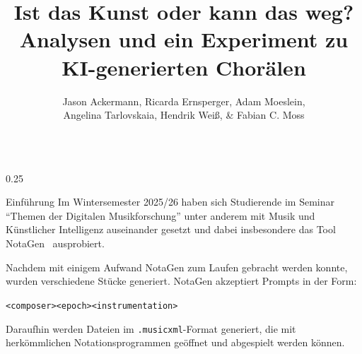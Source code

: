 \documentclass[final]{beamer}
\title{\Huge Ist das Kunst oder kann das weg? \\ \huge Analysen und ein Experiment zu KI-generierten Chorälen}
\author{Jason Ackermann, Ricarda Ernsperger, Adam Moeslein,\\ Angelina Tarlovskaia, Hendrik Weiß, \& Fabian C. Moss}
\institute{Institut für Musikforschung | Julius-Maximilians-Universität Würzburg}
\newcommand{\alap}{\=al\=ap}
\begin{document}
\begin{frame}[t]

  \vfill
  
  \begin{columns}[t]
    \begin{column}{0.25\textwidth}
      \begin{block}{Einführung}
        Im Wintersemester 2025/26 haben sich Studierende im Seminar 
        ``Themen der Digitalen Musikforschung'' unter anderem mit 
        Musik und Künstlicher Intelligenz auseinander gesetzt und dabei 
        insbesondere das Tool \alert{NotaGen}~\autocite{notagen} ausprobiert. 

        Nachdem mit einigem Aufwand NotaGen zum Laufen gebracht werden konnte,
        wurden verschiedene Stücke generiert. NotaGen akzeptiert Prompts in der Form:

        \texttt{<composer><epoch><instrumentation>}
        
        Daraufhin werden Dateien im \texttt{.musicxml}-Format generiert,
        die mit herkömmlichen Notationsprogrammen
        geöffnet und abgespielt werden können.

        
      \end{block}
    \end{column}


\end{columns}
\end{frame}
\end{document}
